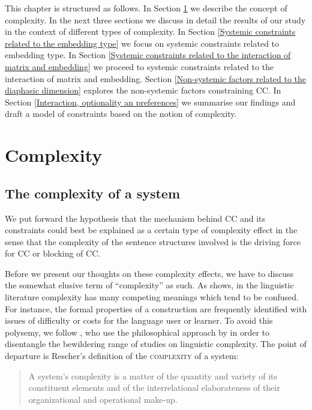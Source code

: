 This chapter is structured as follows. In Section \ref{Complexity} we describe the concept of complexity. In the next three sections we discuss in detail the results of our study in the context of different types of complexity. In Section \ref{Systemic constraints related to the embedding type} we focus on systemic constraints related to embedding type. In Section \ref{Systemic constraints related to the interaction of matrix and embedding} we proceed to systemic constraints related to the interaction of matrix and embedding. Section \ref{Non-systemic factors related to the diaphasic dimension} explores the non-systemic factors constraining CC. In Section \ref{Interaction, optionality an preferences} we summarise our findings and draft a model of constraints based on the notion of complexity.

\section{Complexity}
\label{Complexity}
\subsection{The complexity of a system}
\label{The complexity of a system}
We put forward the hypothesis that the mechanism behind CC and its constraints could best be explained as a certain type of complexity effect in the sense that the complexity of the sentence structures involved is the driving force for CC or blocking of CC.

Before we present our thoughts on these complexity effects, we have to discuss the somewhat elusive term of ``complexity'' as such. As \citet[][118]{Pallotti15} shows, in the linguistic literature complexity has many competing meanings which tend to be confused. For instance, the formal properties of a construction are frequently identified with issues of difficulty or costs for the language user or learner. To avoid this polysemy, we follow \citet[][vii]{KMS08}, who use the philosophical approach by \citet[][]{Rescher98} in order to disentangle the bewildering range of studies on linguistic complexity. The point of departure is Rescher’s definition of the \textsc{complexity} of a system:

\begin{quotation}
A system’s complexity is a matter of the quantity and variety of its constituent elements and of the interrelational elaborateness of their organizational and operational make-up.\hfill\hbox{\citet[][1]{Rescher98}}\hbox{}
\end{quotation}

